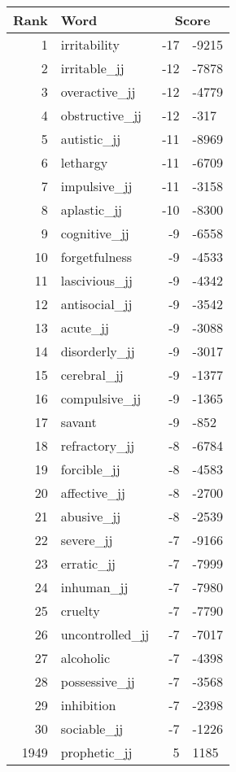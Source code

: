 \begin{longtable}[!htbp]{| rlr@{.}l |}
    \hline
    \textbf{Rank} & \textbf{Word} & \multicolumn{2}{c|}{\textbf{Score}} \\
    \hline
    \endhead
    1 & irritability & -17 & -9215 \\
    2 & irritable\_jj & -12 & -7878 \\
    3 & overactive\_jj & -12 & -4779 \\
    4 & obstructive\_jj & -12 & -317 \\
    5 & autistic\_jj & -11 & -8969 \\
    6 & lethargy & -11 & -6709 \\
    7 & impulsive\_jj & -11 & -3158 \\
    8 & aplastic\_jj & -10 & -8300 \\
    9 & cognitive\_jj & -9 & -6558 \\
    10 & forgetfulness & -9 & -4533 \\
    11 & lascivious\_jj & -9 & -4342 \\
    12 & antisocial\_jj & -9 & -3542 \\
    13 & acute\_jj & -9 & -3088 \\
    14 & disorderly\_jj & -9 & -3017 \\
    15 & cerebral\_jj & -9 & -1377 \\
    16 & compulsive\_jj & -9 & -1365 \\
    17 & savant & -9 & -852 \\
    18 & refractory\_jj & -8 & -6784 \\
    19 & forcible\_jj & -8 & -4583 \\
    20 & affective\_jj & -8 & -2700 \\
    21 & abusive\_jj & -8 & -2539 \\
    22 & severe\_jj & -7 & -9166 \\
    23 & erratic\_jj & -7 & -7999 \\
    24 & inhuman\_jj & -7 & -7980 \\
    25 & cruelty & -7 & -7790 \\
    26 & uncontrolled\_jj & -7 & -7017 \\
    27 & alcoholic & -7 & -4398 \\
    28 & possessive\_jj & -7 & -3568 \\
    29 & inhibition & -7 & -2398 \\
    30 & sociable\_jj & -7 & -1226 \\
    1949 & prophetic\_jj & 5 & 1185 \\

\end{longtable}
